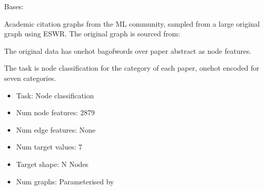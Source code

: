 \documentclass[letterpaper,10pt,english]{sphinxhowto}
\begin{document}
\begin{fulllineitems}
\label{\detokenize{datasets:datasets.CoraDataset}}
\pysigstartsignatures
{}
\pysigstopsignatures
\sphinxAtStartPar
Bases: 

\sphinxAtStartPar
Academic citation graphs from the ML community, sampled from a large original graph using ESWR.
The original graph is sourced from:
\begin{quote}

\sphinxAtStartPar
{}
\end{quote}

\sphinxAtStartPar
The original data has one\sphinxhyphen{}hot bag\sphinxhyphen{}of\sphinxhyphen{}words over paper abstract as node features.

\sphinxAtStartPar
The task is node classification for the category of each paper, one\sphinxhyphen{}hot encoded for seven categories.
\begin{itemize}
\item {} 
\sphinxAtStartPar
Task: Node classification

\item {} 
\sphinxAtStartPar
Num node features: 2879

\item {} 
\sphinxAtStartPar
Num edge features: None

\item {} 
\sphinxAtStartPar
Num target values: 7

\item {} 
\sphinxAtStartPar
Target shape: N Nodes

\item {} 
\sphinxAtStartPar
Num graphs: Parameterised by 


\end{itemize}
\end{fulllineitems}
\end{document}
